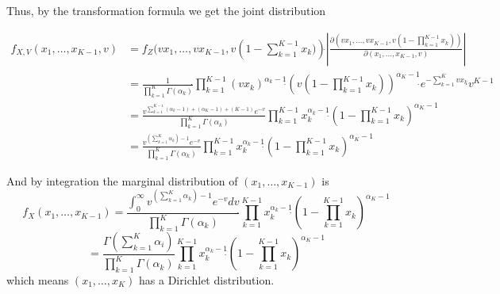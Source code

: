 \documentclass[]{article}
\begin{document}
Thus, by the transformation formula we get the joint distribution

\begin{align}
f_{X,V}(x_1,\dots,x_{K-1},v)
&= f_Z(vx_1,\dots,vx_{K-1},v\left(1-\sum_{k=1}^{K-1}x_k)\right) \dot{} \left\lvert \frac{\partial \left(vx_1, \dots,vx_{K-1}, v\left(1-\prod_{k=1}^{K-1}x_k\right)\right)}{\partial (x_1,\dots,x_{K-1},v)} \right\rvert \\
&= \frac{1}{\prod_{k=1}^K\Gamma(\alpha_k)}\dot{} \prod_{k=1}^{K-1}(vx_k)^{\alpha_k-1} \dot{} \left(v\left(1-\prod_{k=1}^{K-1}x_k\right)\right)^{\alpha_K-1} \dot{} e^{-\sum_{k=1}^Kvx_k} \dot{} v^{K-1} \\
&= \frac{v^{\sum_{k=1}^{K-1}(\alpha_k-1)+(\alpha_K-1)+(K-1)}e^{-v}}{\prod_{k=1}^K\Gamma(\alpha_k)}\dot{} \prod_{k=1}^{K-1}x_k^{\alpha_k-1} \dot{} \left(1-\prod_{k=1}^{K-1}x_k\right)^{\alpha_K-1} \\
&= \frac{v^{(\sum_{k=1}^{K}\alpha_k)-1}e^{-v}}{\prod_{k=1}^K\Gamma(\alpha_k)}\dot{} \prod_{k=1}^{K-1}x_k^{\alpha_k-1} \dot{} \left(1-\prod_{k=1}^{K-1}x_k\right)^{\alpha_K-1}
\end{align}

And by integration the marginal distribution of \((x_1,\dots,x_{K-1})\)
is \[
f_X(x_1,\dots,x_{K-1})=  \frac{\int_0^\infty v^{(\sum_{k=1}^{K}\alpha_k)-1}e^{-v}dv}{\prod_{k=1}^K\Gamma(\alpha_k)}\dot{} \prod_{k=1}^{K-1}x_k^{\alpha_k-1} \dot{} \left(1-\prod_{k=1}^{K-1}x_k\right)^{\alpha_K-1}
\]
\[= \frac{\Gamma(\sum_{k=1}^{K}\alpha_i)}{\prod_{k=1}^K\Gamma(\alpha_k)}\dot{} \prod_{k=1}^{K-1}x_k^{\alpha_k-1} \dot{} \left(1-\prod_{k=1}^{K-1}x_k\right)^{\alpha_K-1}
\] which means \((x_1,\dots,x_K)\) has a Dirichlet distribution.
\end{document}
